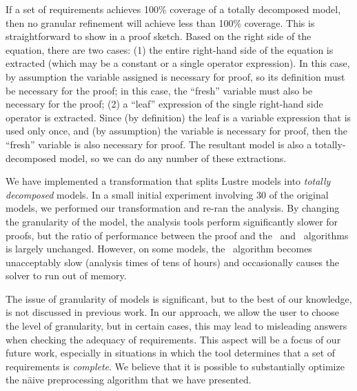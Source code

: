 If a set of requirements achieves 100\% coverage of a totally decomposed model, then no granular refinement will achieve less than 100\% coverage.  This is straightforward to show in a proof sketch.  Based on the right side of the equation, there are two cases: (1) the entire right-hand side of the equation is extracted (which may be a constant or a single operator expression). In this case, by assumption the variable assigned is necessary for proof, so its definition must be necessary for the proof; in this case, the ``fresh'' variable must also be necessary for the proof; (2) a ``leaf'' expression of the single right-hand side operator is extracted.  Since (by definition) the leaf is a variable expression that is used only once, and (by assumption) the variable is necessary for proof, then the ``fresh'' variable is also necessary for proof.  The resultant model is also a totally-decomposed model, so we can do any number of these extractions.

We have implemented a transformation that splits Lustre models into {\em totally decomposed} models.  In a small initial experiment involving 30 of the original models, we performed our transformation and re-ran the analysis.  By changing the granularity of the model, the analysis tools perform significantly slower for proofs, but the ratio of performance between the proof and the \ucalg\ and \mustalg\ algorithms is largely unchanged.  However, on some models, the \mustalg\ algorithm becomes unacceptably slow (analysis times of tens of hours) and occasionally causes the solver to run out of memory.

The issue of granularity of models is significant, but to the best of our knowledge, is not discussed in previous work.  In our approach, we allow the user to choose the level of granularity, but in certain cases, this may lead to misleading answers when checking the adequacy of requirements.  This aspect will be a focus of our future work, especially in situations in which the tool determines that a set of requirements is {\em complete}.  We believe that it is possible to substantially optimize the n{\"a}ive preprocessing algorithm that we have presented.

